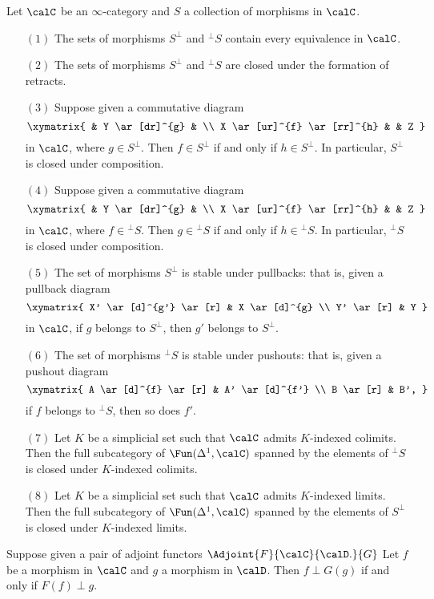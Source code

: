 \begin{proposition}\label{swimmm}
Let $\calC$ be an $\infty$-category and $S$ a collection of morphisms in $\calC$.
\begin{itemize}
\item[$(1)$] The sets of morphisms $S^{\perp}$ and $^{\perp}S$ contain every equivalence in $\calC$.
\item[$(2)$] The sets of morphisms $S^{\perp}$ and $^{\perp}S$ are closed under the formation of retracts.
\item[$(3)$] Suppose given a commutative diagram
$$ \xymatrix{ & Y \ar[dr]^{g} & \\
X \ar[ur]^{f} \ar[rr]^{h} & & Z }$$
in $\calC$, where $g \in S^{\perp}$. Then $f \in S^{\perp}$ if and only if $h \in S^{\perp}$. In particular, $S^{\perp}$ is closed under composition.

\item[$(4)$] Suppose given a commutative diagram
$$ \xymatrix{ & Y \ar[dr]^{g} & \\
X \ar[ur]^{f} \ar[rr]^{h} & & Z }$$
in $\calC$, where $f \in {}^{\perp}S$. Then $g \in {}^{\perp}S$ if and only if $h \in {}^{\perp}S$. In particular, $^{\perp}S$ is closed under composition.

\item[$(5)$] The set of morphisms $S^{\perp}$ is stable under pullbacks: that is, given a pullback diagram
$$ \xymatrix{ X' \ar[d]^{g'} \ar[r] & X \ar[d]^{g} \\
Y' \ar[r] & Y }$$
in $\calC$, if $g$ belongs to $S^{\perp}$, then $g'$ belongs to $S^{\perp}$.
\item[$(6)$] The set of morphisms $^{\perp}S$ is stable under pushouts: that is, given a pushout diagram
$$ \xymatrix{ A \ar[d]^{f} \ar[r] & A' \ar[d]^{f'} \\
B \ar[r] & B', }$$
if $f$ belongs to $^{\perp}S$, then so does $f'$.
\item[$(7)$] Let $K$ be a simplicial set such that $\calC$ admits $K$-indexed colimits.
Then the full subcategory of $\Fun( \Delta^1, \calC)$ spanned by the elements of
$^{\perp}S$ is closed under $K$-indexed colimits.
\item[$(8)$] Let $K$ be a simplicial set such that $\calC$ admits $K$-indexed limits. Then the full subcategory of $\Fun( \Delta^1, \calC)$ spanned by the elements of $S^{\perp}$ is closed under $K$-indexed limits.
\end{itemize}
\end{proposition}

\begin{remark}\label{smule}
Suppose given a pair of adjoint functors $\Adjoint{F}{\calC}{\calD.}{G}$
Let $f$ be a morphism in $\calC$ and $g$ a morphism in $\calD$. Then
$f \perp G(g)$ if and only if $F(f) \perp g$.
\end{remark}

